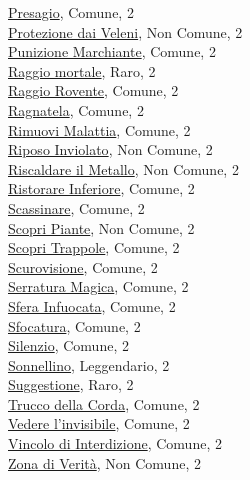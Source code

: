 \begin{multicols}{3}
{{\hyperlink{Presagio}{Presagio}, Comune, 2\\
\hyperlink{Protezione dai Veleni}{Protezione dai Veleni}, Non Comune, 2\\
\hyperlink{Punizione Marchiante}{Punizione Marchiante}, Comune, 2\\
\hyperlink{Raggio mortale}{Raggio mortale}, Raro, 2\\
\hyperlink{Raggio Rovente}{Raggio Rovente}, Comune, 2\\
\hyperlink{Ragnatela}{Ragnatela}, Comune, 2\\
\hyperlink{Rimuovi Malattia}{Rimuovi Malattia}, Comune, 2\\
\hyperlink{Riposo Inviolato}{Riposo Inviolato}, Non Comune, 2\\
\hyperlink{Riscaldare il Metallo}{Riscaldare il Metallo}, Non Comune, 2\\
\hyperlink{Ristorare Inferiore}{Ristorare Inferiore}, Comune, 2\\
\hyperlink{Scassinare}{Scassinare}, Comune, 2\\
\hyperlink{Scopri Piante}{Scopri Piante}, Non Comune, 2\\
\hyperlink{Scopri Trappole}{Scopri Trappole}, Comune, 2\\
\hyperlink{Scurovisione}{Scurovisione}, Comune, 2\\
\hyperlink{Serratura Magica}{Serratura Magica}, Comune, 2\\
\hyperlink{Sfera Infuocata}{Sfera Infuocata}, Comune, 2\\
\hyperlink{Sfocatura}{Sfocatura}, Comune, 2\\
\hyperlink{Silenzio}{Silenzio}, Comune, 2\\
\hyperlink{Sonnellino}{Sonnellino}, Leggendario, 2\\
\hyperlink{Suggestione}{Suggestione}, Raro, 2\\
\hyperlink{Trucco della Corda}{Trucco della Corda}, Comune, 2\\
\hyperlink{Vedere l'invisibile}{Vedere l'invisibile}, Comune, 2\\
\hyperlink{Vincolo di Interdizione}{Vincolo di Interdizione}, Comune, 2\\
\hyperlink{Zona di Verità}{Zona di Verità}, Non Comune, 2\\

}}
\end{multicols}
